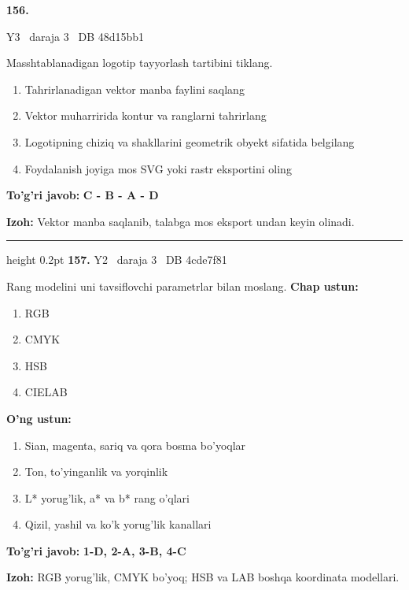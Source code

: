 \documentclass[10pt,a4paper,oneside]{article}
\begin{document}
\hypertarget{q156}{\textbf{\color{ink}156.}}  {\color{muted}\scriptsize Y3 \textbullet\ daraja 3 \textbullet\ DB 48d15bb1}
\par
Masshtablanadigan logotip tayyorlash tartibini tiklang.
\begin{enumerate}[label=\Alph*),leftmargin=9mm]
\item Tahrirlanadigan vektor manba faylini saqlang
\item Vektor muharririda kontur va ranglarni tahrirlang
\item Logotipning chiziq va shakllarini geometrik obyekt sifatida belgilang
\item Foydalanish joyiga mos SVG yoki rastr eksportini oling
\end{enumerate}
\begin{tcolorbox}[enhanced,breakable,colback=teal!4,colframe=teal!45!black,boxrule=0.45pt,arc=1.2mm,left=2.8mm,right=2.8mm,top=2mm,bottom=2mm,before skip=2mm,after skip=2mm]
\textbf{\color{teal}To'g'ri javob:} \textbf{C - B - A - D}
\par\smallskip
\textbf{Izoh:} Vektor manba saqlanib, talabga mos eksport undan keyin olinadi.
\end{tcolorbox}
\vspace{2mm}\hrule height 0.2pt \vspace{4mm}
\hypertarget{q157}{\textbf{\color{ink}157.}}  {\color{muted}\scriptsize Y2 \textbullet\ daraja 3 \textbullet\ DB 4cde7f81}
\par
Rang modelini uni tavsiflovchi parametrlar bilan moslang.
\textbf{\footnotesize Chap ustun:}
\begin{enumerate}[label=\arabic*),leftmargin=9mm]
\item RGB
\item CMYK
\item HSB
\item CIELAB
\end{enumerate}
\textbf{\footnotesize O'ng ustun:}
\begin{enumerate}[label=\Alph*),leftmargin=9mm]
\item Sian, magenta, sariq va qora bosma bo'yoqlar
\item Ton, to'yinganlik va yorqinlik
\item L* yorug'lik, a* va b* rang o'qlari
\item Qizil, yashil va ko'k yorug'lik kanallari
\end{enumerate}
\begin{tcolorbox}[enhanced,breakable,colback=teal!4,colframe=teal!45!black,boxrule=0.45pt,arc=1.2mm,left=2.8mm,right=2.8mm,top=2mm,bottom=2mm,before skip=2mm,after skip=2mm]
\textbf{\color{teal}To'g'ri javob:} \textbf{1-D, 2-A, 3-B, 4-C}
\par\smallskip
\textbf{Izoh:} RGB yorug'lik, CMYK bo'yoq; HSB va LAB boshqa koordinata modellari.
\end{tcolorbox}
\end{document}
